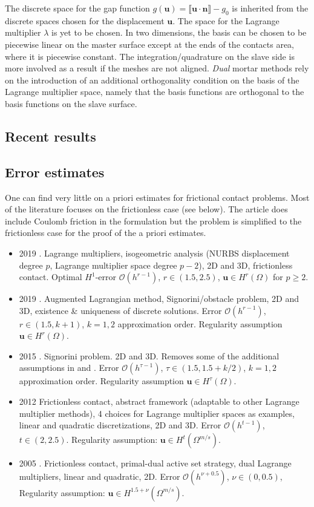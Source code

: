 \documentclass[12pt]{article}
\newcommand{\mbf}[1]{\mathbf{#1}}
\newcommand{\mbn}{\mbf{n}}
\newcommand{\mbu}{\mbf{u}}
\newcommand{\jump}[1]{\llbracket #1 \rrbracket}
\begin{document}
The discrete space for the gap function $g(\mbu) = \jump{\mbu \cdot \mbn} -g_0$ is inherited from the discrete spaces chosen for the displacement $\mbu$.  The space for the Lagrange
multiplier $\lambda$ is yet to be chosen. In two dimensions, the basis can be chosen to be piecewise linear on the master surface except at the ends of the contacts area, where it is piecewise constant. The integration/quadrature on the slave side is more involved as a result if the meshes are not aligned. \emph{Dual} mortar methods rely on the introduction of an additional orthogonality condition on the basis of the Lagrange multiplier space, namely that the basis functions are orthogonal to the basis functions on the slave surface.
\subsection{Recent results}
\subsection{Error estimates}
One can find very little on a priori estimates for frictional contact problems. Most of the literature focuses on the frictionless case (see below). The article \cite{wohlmuth2012abstract} does include Coulomb friction in the formulation but the problem is
simplified to the frictionless case for the proof of the a priori estimates.
\begin{itemize}
  \item 2019 \cite{antolin2019priori}. Lagrange multipliers, isogeometric analysis (NURBS displacement degree $p$, Lagrange multiplier space degree $p-2$), 2D and 3D, frictionless contact. Optimal $H^1$-error $\mathcal{O}(h^{r-1})$, $r \in (1.5, 2.5)$, $\bm u \in H^r(\Omega)$ for $p \geq 2$.
  \item 2019 \cite{burman2019augmented}. Augmented Lagrangian method, Signorini/obstacle problem, 2D and 3D, existence \& uniqueness of discrete solutions. Error $\mathcal{O}(h^{r-1})$, $r \in (1.5, k+1)$, $k=1,2$ approximation order. Regularity assumption $\bm u \in H^r(\Omega)$.
  \item 2015 \cite{drouet2015optimal}. Signorini problem. 2D and 3D. Removes some of the additional assumptions in \cite{hueber2005priori} and \cite{wohlmuth2012abstract}.
   Error $\mathcal{O}(h^{\tau-1})$, $\tau \in (1.5, 1.5+k/2)$, $k=1,2$ approximation order. Regularity assumption $\bm u \in H^{\tau}(\Omega)$.
  \item 2012 \cite{wohlmuth2012abstract} Frictionless contact, abstract framework (adaptable to other Lagrange multiplier methods), 4 choices for Lagrange multiplier spaces as examples, linear and quadratic discretizations, 2D and 3D. Error $\mathcal{O}(h^{t-1})$, $t \in (2,2.5)$. Regularity assumption: $\bm u \in H^t(\Omega^{m/s})$.
  \item 2005 \cite{hueber2005priori}. Frictionless contact, primal-dual active set strategy, dual Lagrange multipliers, linear and quadratic, 2D. Error $\mathcal{O}(h^{\nu + 0.5})$, $\nu \in (0, 0.5)$, Regularity assumption: $\bm u \in H^{1.5+\nu}(\Omega^{m/s})$.
\end{itemize}
\end{document}
